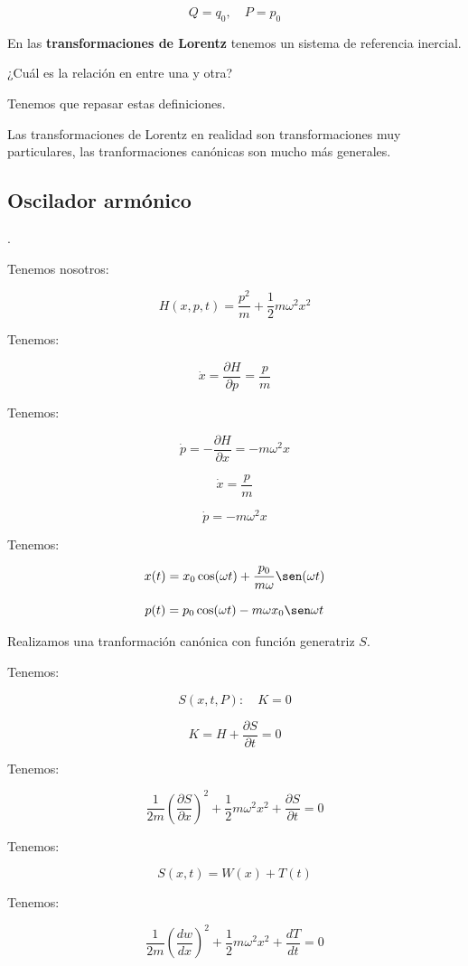\documentclass{article}
\begin{document}
\[ \boxed{ Q = q_{0}, \quad P=p_{0}  } \]


En las \textbf{transformaciones de Lorentz} tenemos un sistema de referencia inercial.

¿Cuál es la relación en entre una y otra? 

Tenemos que repasar estas definiciones. 

Las transformaciones de Lorentz en realidad son transformaciones muy particulares, las tranformaciones canónicas son mucho más generales.


\subsection{Oscilador armónico}.

Tenemos nosotros:


\[ H(x,p,t) = \frac{ p^{2} }{m} + \frac{1}{2} m\omega^{2}x^{2} \]

Tenemos:


\[ \dot{x} = \frac{\partial H}{\partial p} = \frac{p}{m}  \]


Tenemos:


\[ \dot{p} = - \frac{\partial H}{\partial x} = -m\omega^{2}{x} \]


\[ \dot{x} = \frac{p}{m}\]


\[ \dot{p }= -m\omega^{2}{x} \]


Tenemos:

\[ x(t) = x_{0}\cos(\omega{t}) + \frac{p_{0}}{m\omega} \sen(\omega{t}) \]

\[ p(t) = p_{0}\cos(\omega{t}) - m\omega x_{0}\sen\omega{t}  \]



Realizamos una tranformación canónica con función generatriz $S$. 


Tenemos:


\[ S(x,t,P): \quad K=0 \]


\[ K = H + \frac{\partial S}{\partial t}  = 0 \]

Tenemos:



\[  \frac{1}{2m} \left(  \frac{ \partial S }{\partial x}  \right)^{2} + \frac{1}{2}m\omega^{2}x^{2} + \frac{\partial S}{\partial t} =0    \]


Tenemos:


\[ S(x,t) = W(x) + T(t)  \]


Tenemos:


\[  \frac{1}{2m} \left(  \frac{ dw }{dx} \right)^{2} + \frac{1}{2} m\omega^{2}x^{2} + \frac{dT}{dt} =0  \]
\end{document}
